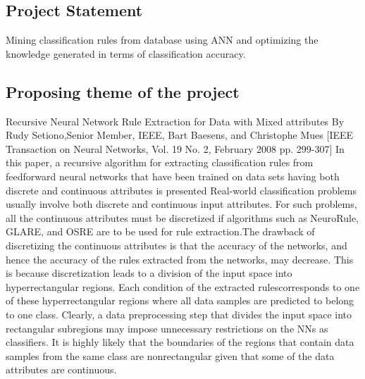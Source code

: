 \documentclass[a4paper,14pt,onecolumn]{article}
\begin{document}
 \subsection{Project Statement}
 Mining classification rules from database using ANN and optimizing the knowledge generated in terms of classification accuracy.\\

 \subsection{Proposing theme of the project}
Recursive Neural Network Rule Extraction for Data with Mixed attributes By Rudy Setiono,Senior Member, IEEE, Bart Baesens, and Christophe Mues [IEEE Transaction on Neural Networks, Vol. 19 No. 2, February 2008 pp. 299-307]
In this paper, a recursive algorithm for extracting classification rules from feedforward neural networks that have been trained on data sets having both discrete and continuous attributes is presented Real-world classification problems usually involve both discrete and continuous input attributes. For such problems, all the continuous attributes must be discretized if algorithms such as NeuroRule, GLARE, and OSRE are to be used for rule extraction.The drawback of discretizing the continuous attributes is that the accuracy of the networks, and hence the accuracy of the rules extracted from the networks, may decrease. This is because discretization leads to a division of the input space into hyperrectangular regions. Each condition of the extracted rulescorresponds to one of these hyperrectangular regions where all data samples are predicted to belong to one class. Clearly, a data preprocessing step that divides the input space into rectangular subregions may impose unnecessary restrictions on the NNs as classifiers. It is highly likely that the boundaries of the regions that contain data samples from the same class are nonrectangular given that some of the data attributes are continuous.\\
\end{document}
